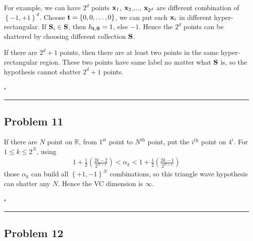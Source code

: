 \documentclass[12pt]{article}
\newcommand*{\QEDB}{\hfill\ensuremath{\square}}
\newcommand{\CBrackets}[1]{\left\{#1\right\}}
\newcommand{\ParTh}[1]{\left(#1\right)}
\newcommand{\BF}[1]{{\bf#1}}
\newcommand{\horrule}[1]{\rule{\linewidth}{#1}}
\begin{document}
For example, we can have $2^d$ points $\BF{x}_1$, $\BF{x}_2$,$\ldots$, $\BF{x}_{2^d}$ are different combination of $\CBrackets{-1,+1}^d$. Choose $\BF{t}=\CBrackets{0,0,\ldots,0}$, we can put each $\BF{x}_i$ in different hyper-rectangular. If $\BF{S}_i\in\BF{S}$, then $h_{\BF{t},\BF{S}}=1$, else $-1$. Hence the $2^d$ points can be shattered by choosing different collection $\BF{S}$.

If there are $2^d + 1$ points, then there are at least two points in the same hyper-rectangular region. These two points have same label no matter what $\BF{S}$ is, so the hypothesis cannot shatter $2^d+1$ points.

\QEDB

\horrule{0.5pt}

\subsection*{Problem 11}

If there are $N$ point on $\mathbb{R}$, from $1^{\text{st}}$ point to $N^{\text{th}}$ point, put the $i^{\text{th}}$ point on $4^{i}$. For $1\leq k\leq2^N$, using
\begin{align}
1+\frac{1}{2}\ParTh{\frac{2k-2}{2^{N+1}}} < \alpha_k < 1+\frac{1}{2}\ParTh{\frac{2k-1}{2^{N+1}}}
\end{align}
those $\alpha_k$ can build all $\CBrackets{+1,-1}^N$ combinations, so this triangle wave hypothesis can shatter any $N$. Hence the VC dimension is $\infty$.

\QEDB

\horrule{0.5pt}

\subsection*{Problem 12}
\end{document}
